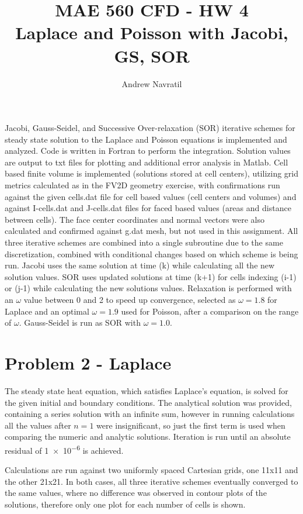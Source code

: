 \documentclass[conf]{new-aiaa}
\title{MAE 560 CFD - HW 4\\Laplace and Poisson with Jacobi, GS, SOR}
\author{Andrew Navratil}
\begin{document}
\maketitle

Jacobi, Gauss-Seidel, and Successive Over-relaxation (SOR) iterative schemes for steady state solution to the Laplace and Poisson equations is implemented and analyzed.  Code is written in Fortran to perform the integration.  Solution values are output to txt files for plotting and additional error analysis in Matlab.  Cell based finite volume is implemented (solutions stored at cell centers), utilizing grid metrics calculated as in the FV2D geometry exercise, with confirmations run against the given cells.dat file for cell based values (cell centers and volumes) and against I-cells.dat and J-cells.dat files for faced based values (areas and distance between cells).  The face center coordinates and normal vectors were also calculated and confirmed against g.dat mesh, but not used in this assignment.  All three iterative schemes are combined into a single subroutine due to the same discretization, combined with conditional changes based on which scheme is being run.  Jacobi uses the same solution at time (k) while calculating all the new solution values.  SOR uses updated solutions at time (k+1) for cells indexing (i-1) or (j-1) while calculating the new solutions values.  Relaxation is performed with an $\omega$ value between 0 and 2 to speed up convergence, selected as $\omega=1.8$ for Laplace and an optimal $\omega=1.9$ used for Poisson, after a comparison on the range of $\omega$.  Gauss-Seidel is run as SOR with $\omega=1.0$.

\section*{Problem 2 - Laplace}

The steady state heat equation, which satisfies Laplace's equation, is solved for the given initial and boundary conditions.  The analytical solution was provided, containing a series solution with an infinite sum, however in running calculations all the values after $n=1$ were insignificant, so just the first term is used when comparing the numeric and analytic solutions.  Iteration is run until an absolute residual of \num{1e-6} is achieved.

Calculations are run against two uniformly spaced Cartesian grids, one 11x11 and the other 21x21.  In both cases, all three iterative schemes eventually converged to the same values, where no difference was observed in contour plots of the solutions, therefore only one plot for each number of cells is shown.
\end{document}
